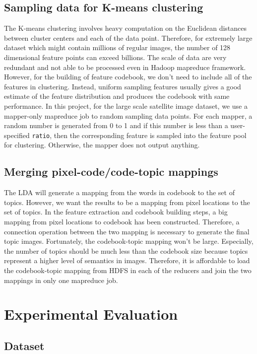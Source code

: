 \documentclass{acm_proc_article-sp}
\begin{document}
\subsection{Sampling data for K-means clustering}
The K-means clustering involves heavy computation on the Euclidean distances between cluster centers and each of the data point. Therefore, for extremely large dataset which might contain millions of regular images, the number of 128 dimensional feature points can exceed billions. The scale of data are very redundant and not able to be processed even in Hadoop mapreduce framework. However, for the building of feature codebook, we don't need to include all of the features in clustering. Instead, uniform sampling features usually gives a good estimate of the feature distribution and produces the codebook with same performance. In this project, for the large scale satellite image dataset, we use a mapper-only mapreduce job to random sampling data points. For each mapper, a random number is generated from 0 to 1 and if this number is less than a user-specified \texttt{ratio}, then the corresponding feature is sampled into the feature pool for clustering. Otherwise, the mapper does not output anything.

\subsection{Merging pixel-code/code-topic mappings}
The LDA will generate a mapping from the words in codebook to the set of topics. However, we want the results to be a mapping from pixel locations to the set of topics. In the feature extraction and codebook building steps, a big mapping from pixel locations to codebook has been constructed. Therefore, a connection operation between the two mapping is necessary to generate the final topic images. Fortunately, the codebook-topic mapping won't be large. Especially, the number of topics should be much less than the codebook size because topics represent a higher level of semantics in images. Therefore, it is affordable to load the codebook-topic mapping from HDFS in each of the reducers and join the two mappings in only one mapreduce job.

\section{Experimental Evaluation}\label{sec:exp}
\subsection{Dataset}
\end{document}

